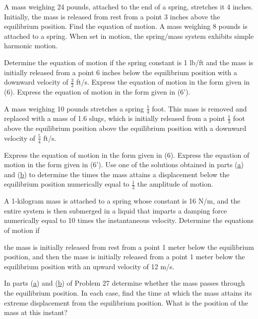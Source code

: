 \documentclass[12pt]{report}
\begin{document}
\begin{enumerate}[label=\arabic*.,start=3]
	\problem A mass weighing 24 pounds, attached to the end of a spring, stretches it 4 inches. Initially, the mass is released from rest from a point 3 inches above the equilibrium position. Find the equation of motion.
	\setcounter{enumi}{8}
	\problem A mass weighing 8 pounds is attached to a spring. When set in motion, the spring/mass system exhibits simple harmonic motion.
	\begin{enumerate}[label=(\alph*)]
	    \subproblem Determine the equation of motion if the spring constant is 1 lb/ft and the mass is initially released from a point 6 inches below the equilibrium position with a downward velocity of $\frac{3}{2}$ ft/s.
		\subproblem Express the equation of motion in the form given in (6).
		\subproblem Express the equation of motion in the form given in (6').
	\end{enumerate}
	\problem A mass weighing 10 pounds stretches a spring $\frac{1}{4}$ foot. This mass is removed and replaced with a mass of 1.6 slugs, which is initially released from a point $\frac{1}{3}$ foot above the equilibrium position above the equilibrium position with a downward velocity of $\frac{5}{4}$ ft/s.
	\begin{enumerate}[label=(\alph*)]
	    \subproblem Express the equation of motion in the form given in (6).
	    \subproblem Express the equation of motion in the form given in (6').
		\subproblem Use one of the solutions obtained in parts (\hyperref[prb:10a]{a}) and (\hyperref[prb:10b]{b}) to determine the times the mass attains a displacement below the equilibrium position numerically equal to $\frac{1}{2}$ the amplitude of motion.
	\end{enumerate}
	\setcounter{enumi}{26}
	\problem A 1-kilogram mass is attached to a spring whose constant is 16 N/m, and the entire system is then submerged in a liquid that imparts a damping force numerically equal to 10 times the instantaneous velocity. Determine the equations of motion if
	\begin{enumerate}[label=(\alph*)]
	    \subproblem the mass is initially released from rest from a point 1 meter below the equilibrium position, and then
		\subproblem the mass is initially released from a point 1 meter below the equilibrium position with an upward velocity of 12 m/s.
	\end{enumerate}
	\problem In parts (\hyperref[prb:27a]{a}) and (\hyperref[prb:27b]{b}) of Problem 27 determine whether the mass passes through the equilibrium position. In each case, find the time at which the mass attains its extreme displacement from the equilibrium position. What is the position of the mass at this instant?

\end{enumerate}
\end{document}
